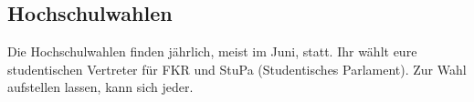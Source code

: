 \subsection{Hochschulwahlen}
Die Hochschulwahlen finden jährlich, meist im Juni, statt. Ihr wählt eure 
studentischen Vertreter für FKR und StuPa (Studentisches Parlament). 
Zur Wahl aufstellen lassen, kann sich jeder.